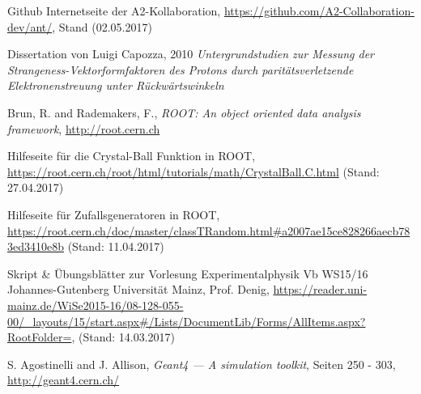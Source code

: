 \documentclass[a4paper,11pt,oneside,final,german,openbib,pdftex]{scrbook}
\begin{document}
{\begin{appendix}



\renewcommand{\bibname}{\bfont Literaturverzeichnis} 

\begin{thebibliography}{99}
 Github Internetseite der A2-Kollaboration, \url{https://github.com/A2-Collaboration-dev/ant/}, Stand (02.05.2017)

 Dissertation von Luigi Capozza, 2010 {\em Untergrundstudien zur Messung der
	Strangeness-Vektorformfaktoren
	des Protons durch parit\"atsverletzende
	Elektronenstreuung unter R\"uckw\"artswinkeln}


 Brun, R. and Rademakers, F., \textit{ROOT: An object oriented data analysis framework}, \url{http://root.cern.ch} 

 Hilfeseite für die Crystal-Ball Funktion in ROOT, \url{https://root.cern.ch/root/html/tutorials/math/CrystalBall.C.html} (Stand: 27.04.2017)

 Hilfeseite f\"ur Zufallsgeneratoren in ROOT, \url{https://root.cern.ch/doc/master/classTRandom.html#a2007ae15ce828266aecb783ed3410e8b} (Stand: 11.04.2017)


 Skript \& Übungsblätter zur Vorlesung Experimentalphysik Vb WS15/16 Johannes-Gutenberg Universit\"at Mainz, Prof. Denig, \url{https://reader.uni-mainz.de/WiSe2015-16/08-128-055-00/_layouts/15/start.aspx#/Lists/DocumentLib/Forms/AllItems.aspx?RootFolder=}, (Stand: 14.03.2017)

 S. Agostinelli and J. Allison, \textit{Geant4 — A simulation toolkit}, Seiten 250 - 303, \url{http://geant4.cern.ch/}



\end{thebibliography}
\end{appendix}}
\end{document}
